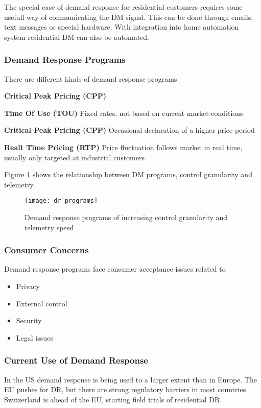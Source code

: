 The special case of demand response for residential customers requires some usefull way of communicating the DM signal.
This can be done through emails, text messages or special hardware.
With integration into home automation system residential DM can also be automated.

\subsubsection{Demand Response Programs}
There are different kinds of demand response programs

\begin{labeling}{\textbf{Critical Peak Pricing (CPP)}}
    \item [\textbf{Time Of Use (TOU)}]
    Fixed rates, not based on current market conditions

    \item [\textbf{Critical Peak Pricing (CPP)}]
    Occasional declaration of a higher price period

    \item [\textbf{Realt Time Pricing (RTP)}]
    Price fluctuation follows market in real time, usually only targeted at industrial customers

\end{labeling}

Figure \ref{fig:dr_programs} shows the relationship between DM programs, control granularity and telemetry.

\begin{figure}
    \centering
    \texttt{[image: dr\_programs]}
    \caption{Demand response programs of increasing control granularity and telemetry speed}
    \label{fig:dr_programs}
\end{figure}

\subsubsection{Consumer Concerns}
Demand response programs face consumer acceptance issues related to
\begin{itemize}
    \item Privacy
    \item External control
    \item Security
    \item Legal issues
\end{itemize}

\subsubsection{Current Use of Demand Response}
In the US demand response is being used to a larger extent than in Europe.
The EU pushes for DR, but there are strong regulatory barriers in most countries.
Switzerland is ahead of the EU, starting field trials of residential DR.
